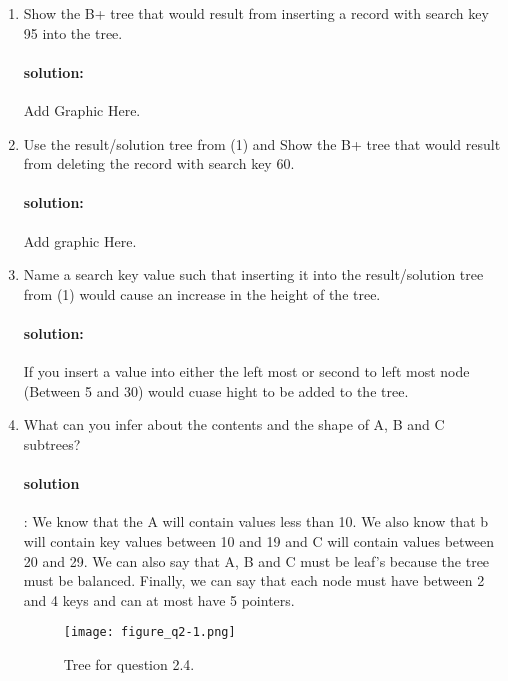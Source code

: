 \documentclass[11pt]{article}
\begin{document}
\begin{enumerate}
	\item Show the B+ tree that would result from inserting a record with search key 95 into the tree.
	\paragraph{solution:} \hfill \break
	Add Graphic Here.

	\item Use the result/solution tree from (1) and Show the B+ tree that would result from deleting the record with search key 60.
		\paragraph{solution:} \hfill \break
		Add graphic Here.

	\item Name a search key value such that inserting it into the result/solution tree from (1) would cause an increase in the height of the tree.
	\paragraph{solution:} \hfill \break
	If you insert a value into either the left most or second to left most node (Between 5 and 30) would cuase hight to be added to the tree.\\

	\item What can you infer about the contents and the shape of A, B and C subtrees?
	\paragraph{solution}: \hfill \break
	We know that the A will contain values less than 10. We also know that b will contain key values between 10 and 19 and C will contain values between 20 and 29. We can also say that A, B and C must be leaf's because the tree must be balanced. Finally, we can say that each node must have between 2 and 4 keys and can at most have 5 pointers.\\
	
	
	\begin{figure}[h]
	\centering
	\texttt{[image: figure\_q2-1.png]}
	\caption{Tree for question 2.4.}
	\label{figure:q2}
    \end{figure}


\end{enumerate}
\end{document}
